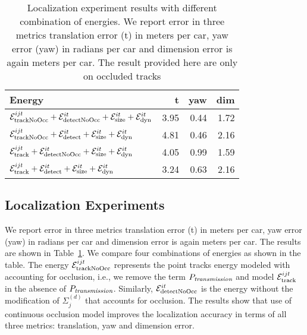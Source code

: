 \begin{table}
  \begin{tabular}{lrrr}
    \toprule
    Energy & t & yaw & dim \\
    \midrule
    $\mathcal{E}^{ijt}_{\text{trackNoOcc}} + \mathcal{E}^{it}_{\text{detectNoOcc}} +\mathcal{E}^{it}_{\text{size}}+\mathcal{E}^{it}_{\text{dyn}}$ 
    & 3.95 & 0.44  & 1.72\\        
    $\mathcal{E}^{ijt}_{\text{trackNoOcc}} + \mathcal{E}^{it}_{\text{detect}} +\mathcal{E}^{it}_{\text{size}}+\mathcal{E}^{it}_{\text{dyn}}$        
    & 4.81 & 0.46  & 2.16\\        
    $\mathcal{E}^{ijt}_{\text{track}} + \mathcal{E}^{it}_{\text{detectNoOcc}} +\mathcal{E}^{it}_{\text{size}}+\mathcal{E}^{it}_{\text{dyn}}$      
    & 4.05 & 0.99  & 1.59\\        
    $\mathcal{E}^{ijt}_{\text{track}} + \mathcal{E}^{it}_{\text{detect}} +\mathcal{E}^{it}_{\text{size}}+\mathcal{E}^{it}_{\text{dyn}}$             
    & 3.24 & 0.63  & 2.16\\
    \bottomrule
  \end{tabular}
  \caption{Localization experiment results with different combination of energies. We report error in three metrics translation error (t) in meters per car, yaw error (yaw) in radians per car and dimension error is again meters per car. The result provided here are only on occluded tracks}
  \label{tab:localizationExperiment}
\end{table}


\subsection{Localization Experiments}
We report error in three metrics translation error (t) in meters per car, yaw
error (yaw) in radians per car and dimension error is again meters per car. The
results are shown in Table~\ref{tab:localizationExperiment}.  We compare four
combinations of energies as shown in the table.  The energy $\mathcal{E}^{ijt}_{\text{trackNoOcc}}$
represents the point tracks energy modeled with accounting for occlusion, i.e.,
we remove the term $P_{\textit{transmission}}$ and model $\mathcal{E}^{ijt}_{\text{track}}$ in the absence of
$P_{\textit{transmission}}$. Similarly, $\mathcal{E}^{it}_{\text{detectNoOcc}}$ is the energy without the
modification of $\Sigma^{(d)}_j$ that accounts for occlusion.  The results show that
use of continuous occlusion model improves the localization accuracy in terms
of all three metrics: translation, yaw and dimension error.

